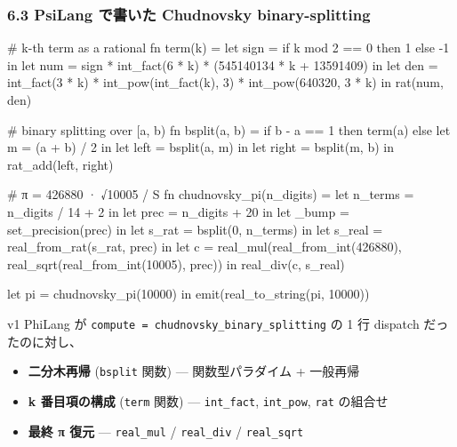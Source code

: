 \documentclass[
]{ltjsarticle}
\newenvironment{Shaded}{}{}
\newcommand{\NormalTok}[1]{#1}
\providecommand{\tightlist}{%
  \setlength{\itemsep}{0pt}\setlength{\parskip}{0pt}}
\begin{document}
\subsubsection{6.3 PsiLang で書いた Chudnovsky
binary-splitting}\label{psilang-ux3067ux66f8ux3044ux305f-chudnovsky-binary-splitting}

\begin{Shaded}
\begin{Highlighting}[]
\NormalTok{\# k{-}th term as a rational}
\NormalTok{fn term(k) =}
\NormalTok{  let sign = if k mod 2 == 0 then 1 else {-}1 in}
\NormalTok{  let num  = sign * int\_fact(6 * k) * (545140134 * k + 13591409) in}
\NormalTok{  let den  = int\_fact(3 * k) * int\_pow(int\_fact(k), 3) * int\_pow(640320, 3 * k) in}
\NormalTok{  rat(num, den)}

\NormalTok{\# binary splitting over [a, b)}
\NormalTok{fn bsplit(a, b) =}
\NormalTok{  if b {-} a == 1 then term(a)}
\NormalTok{  else}
\NormalTok{    let m = (a + b) / 2 in}
\NormalTok{    let left  = bsplit(a, m) in}
\NormalTok{    let right = bsplit(m, b) in}
\NormalTok{    rat\_add(left, right)}

\NormalTok{\# π = 426880 · √10005 / S}
\NormalTok{fn chudnovsky\_pi(n\_digits) =}
\NormalTok{  let n\_terms = n\_digits / 14 + 2 in}
\NormalTok{  let prec    = n\_digits + 20 in}
\NormalTok{  let \_bump   = set\_precision(prec) in}
\NormalTok{  let s\_rat   = bsplit(0, n\_terms) in}
\NormalTok{  let s\_real  = real\_from\_rat(s\_rat, prec) in}
\NormalTok{  let c       = real\_mul(real\_from\_int(426880),}
\NormalTok{                          real\_sqrt(real\_from\_int(10005), prec)) in}
\NormalTok{  real\_div(c, s\_real)}

\NormalTok{let pi  = chudnovsky\_pi(10000) in}
\NormalTok{emit(real\_to\_string(pi, 10000))}
\end{Highlighting}
\end{Shaded}

v1 PhiLang が \texttt{compute\ =\ chudnovsky\_binary\_splitting} の 1 行
dispatch だったのに対し、

\begin{itemize}
\tightlist
\item
  \textbf{二分木再帰} (\texttt{bsplit} 関数) --- 関数型パラダイム +
  一般再帰
\item
  \textbf{k 番目項の構成} (\texttt{term} 関数) --- \texttt{int\_fact},
  \texttt{int\_pow}, \texttt{rat} の組合せ
\item
  \textbf{最終 π 復元} --- \texttt{real\_mul} / \texttt{real\_div} /
  \texttt{real\_sqrt}
\end{itemize}
\end{document}
